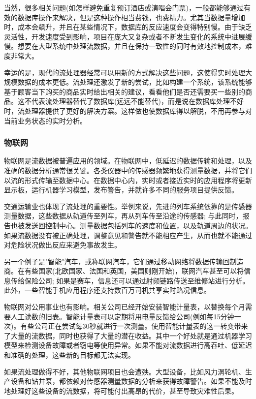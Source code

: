 \documentclass[oneside]{ctexbook}
\begin{document}
当然，很多相关问题(如怎样避免重复预订酒店或演唱会门票)，一般都能够通过有效的数据库操作来解决，但是这种操作相当费钱，也费精力。尤其当数据量增加时，成本会飙升，并且在某些情况下，数据库的反应速度会变得特别慢。由于缺乏灵活性，开发速度受到影响，项目在庞大又复杂或者不断发生变化的系统中进展缓慢。想要在大型系统中处理流数据，并且在保持一致性的同时有效地控制成本，难度非常大。

幸运的是，现代的流处理器经常可以用新的方式解决这些问题，这使得实时处理大规模数据的成本更低。流处理还激发了新的尝试，比如构建一个系统，该系统能够基于顾客当下购买的商品实时给出相关的建议，看看他们是否还需要买一些别的商品。这不代表流处理器替代了数据库(远远不能替代)，而是说在数据库处理不好时，流处理器提供了更好的解决方案。这样做也使数据库得以解脱，不用再参与对当前业务状态的实时分析。

\subsubsection{物联网}

物联网是流数据被普遍应用的领域。在物联网中，低延迟的数据传输和处理，以及准确的数据分析通常很关键。各类仪器中的传感器频繁地获得测量数据，并将它们以流的形式传输至数据中心。在数据中心内，实时或者接近实时的应用程序将更新显示板，运行机器学习模型，发布警告，并就许多不同的服务项目提供反馈。

交通运输业也体现了流处理的重要性。举例来说，先进的列车系统依靠的是传感器测量数据，这些数据从轨道传至列车，再从列车传至沿途的传感器; 与此同时，报告也被发送回控制中心。测量数据包括列车的速度和位置，以及轨道周边的状况。如果流数据没有被正确处理，调整意见和警告就不能相应产生，从而也就不能通过对危险状况做出反应来避免事故发生。

另一个例子是"智能"汽车，或称联网汽车，它们通过移动网络将数据传输回制造商。在有些国家(北欧国家、法国和英国，美国则刚开始)，联网汽车甚至可以将信息传给保险公司; 如果是赛车，信息还可以通过射频链路传送至维修站进行分析。此外，一些智能手机应用程序还支持数百万司机共享实时路况信息。

物联网对公用事业也有影响。相关公司已经开始安装智能计量表，以替换每个月需要人工读数的旧表。智能计量表可以定期将用电量反馈给公司(例如每15分钟一次)。有些公司正在尝试每30秒就进行一次测量。使用智能计量表的这一转变带来了大量的流数据，同时也获得了大量的潜在收益。其中一个好处就是通过机器学习模型来检测设备故障或者窃电等使用异常。如果不能对流数据进行高吞吐、低延迟和准确的处理，这些新的目标都无法实现。

如果流处理做得不好，其他物联网项目也会遭殃。大型设备，比如风力涡轮机、生产设备和钻井泵，都依赖对传感器测量数据的分析来获得故障警告。如果不能及时地处理好这些设备的流数据，将可能付出高昂的代价，甚至导致灾难性后果。
\end{document}
